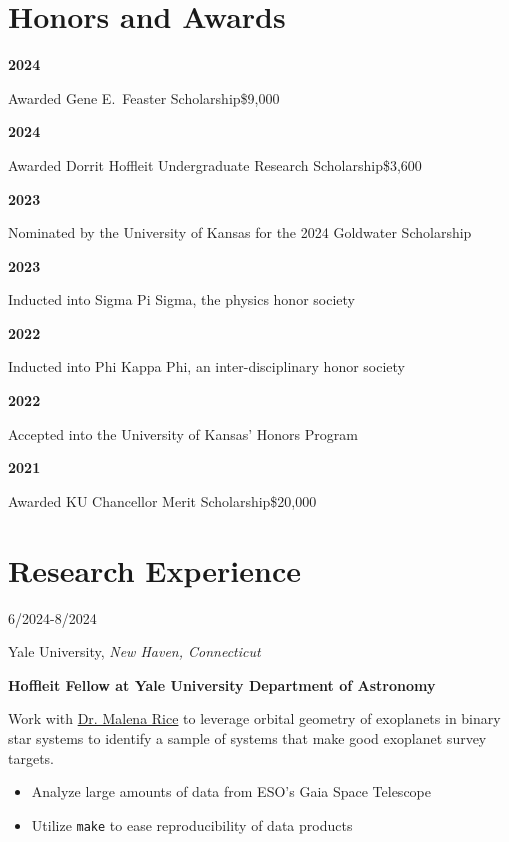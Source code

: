 \documentclass[12pt]{article}
\newenvironment{entry}[4]{
  \medskip
  \begin{minipage}[t]{0.75in}
    #3
  \end{minipage}
  \begin{minipage}[t]{\dimexpr\textwidth-0.75in}
    #1, \textit{#2}

    \textbf{#4}
    
    \smallskip
}{
  \end{minipage}
}
\begin{document}


\section*{Honors and Awards}\vspace{-1ex}

\newcommand{\award}[3]{
  \begin{minipage}[t]{0.75in}
    \textbf{#1}
  \end{minipage}
  \begin{minipage}[t]{\dimexpr\textwidth-0.75in}
    #2\hfill#3
  \end{minipage}
}

\award{2024}{Awarded Gene E.\ Feaster Scholarship}{\$9,000}
\award{2024}{Awarded Dorrit Hoffleit Undergraduate Research Scholarship}{\$3,600}
\award{2023}{Nominated by the University of Kansas for the 2024 Goldwater Scholarship}{}
\award{2023}{Inducted into Sigma Pi Sigma, the physics honor society}{}
\award{2022}{Inducted into Phi Kappa Phi, an inter-disciplinary honor society}{}
\award{2022}{Accepted into the University of Kansas' Honors Program}{}
\award{2021}{Awarded KU Chancellor Merit Scholarship}{\$20,000}

\section*{Research Experience}\vspace{-1ex}

\begin{entry}{Yale University}{New Haven, Connecticut}{6/2024-8/2024}{Hoffleit Fellow at Yale University Department of Astronomy}
  Work with \href{https://astronomy.yale.edu/people/malena-rice}{Dr. Malena Rice} to leverage orbital geometry of exoplanets in binary star systems to identify a sample of systems that make good exoplanet survey targets.
  \begin{itemize}
    \item Analyze large amounts of data from ESO's Gaia Space Telescope
    \item Utilize \texttt{make} to ease reproducibility of data products
  \end{itemize}
\end{entry}
\end{document}
